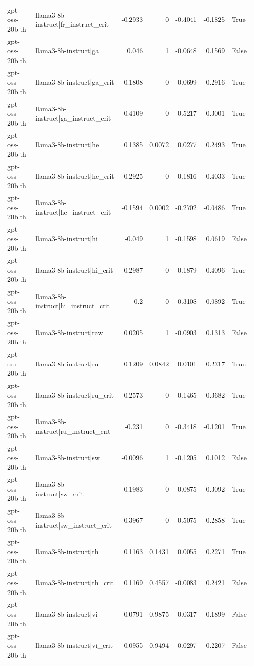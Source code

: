 \begin{table}
\begin{tabular}{l l r r r r l}
gpt-oss-20b|th & llama3-8b-instruct|fr_instruct_crit & -0.2933 & 0 & -0.4041 & -0.1825 & True \\
gpt-oss-20b|th & llama3-8b-instruct|ga & 0.046 & 1 & -0.0648 & 0.1569 & False \\
gpt-oss-20b|th & llama3-8b-instruct|ga_crit & 0.1808 & 0 & 0.0699 & 0.2916 & True \\
gpt-oss-20b|th & llama3-8b-instruct|ga_instruct_crit & -0.4109 & 0 & -0.5217 & -0.3001 & True \\
gpt-oss-20b|th & llama3-8b-instruct|he & 0.1385 & 0.0072 & 0.0277 & 0.2493 & True \\
gpt-oss-20b|th & llama3-8b-instruct|he_crit & 0.2925 & 0 & 0.1816 & 0.4033 & True \\
gpt-oss-20b|th & llama3-8b-instruct|he_instruct_crit & -0.1594 & 0.0002 & -0.2702 & -0.0486 & True \\
gpt-oss-20b|th & llama3-8b-instruct|hi & -0.049 & 1 & -0.1598 & 0.0619 & False \\
gpt-oss-20b|th & llama3-8b-instruct|hi_crit & 0.2987 & 0 & 0.1879 & 0.4096 & True \\
gpt-oss-20b|th & llama3-8b-instruct|hi_instruct_crit & -0.2 & 0 & -0.3108 & -0.0892 & True \\
gpt-oss-20b|th & llama3-8b-instruct|raw & 0.0205 & 1 & -0.0903 & 0.1313 & False \\
gpt-oss-20b|th & llama3-8b-instruct|ru & 0.1209 & 0.0842 & 0.0101 & 0.2317 & True \\
gpt-oss-20b|th & llama3-8b-instruct|ru_crit & 0.2573 & 0 & 0.1465 & 0.3682 & True \\
gpt-oss-20b|th & llama3-8b-instruct|ru_instruct_crit & -0.231 & 0 & -0.3418 & -0.1201 & True \\
gpt-oss-20b|th & llama3-8b-instruct|sw & -0.0096 & 1 & -0.1205 & 0.1012 & False \\
gpt-oss-20b|th & llama3-8b-instruct|sw_crit & 0.1983 & 0 & 0.0875 & 0.3092 & True \\
gpt-oss-20b|th & llama3-8b-instruct|sw_instruct_crit & -0.3967 & 0 & -0.5075 & -0.2858 & True \\
gpt-oss-20b|th & llama3-8b-instruct|th & 0.1163 & 0.1431 & 0.0055 & 0.2271 & True \\
gpt-oss-20b|th & llama3-8b-instruct|th_crit & 0.1169 & 0.4557 & -0.0083 & 0.2421 & False \\
gpt-oss-20b|th & llama3-8b-instruct|vi & 0.0791 & 0.9875 & -0.0317 & 0.1899 & False \\
gpt-oss-20b|th & llama3-8b-instruct|vi_crit & 0.0955 & 0.9494 & -0.0297 & 0.2207 & False \\

\end{tabular}
\end{table}
